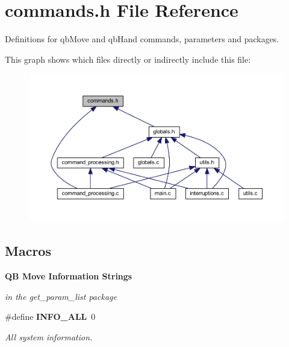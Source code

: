 \section{commands.\+h File Reference}
\label{commands_8h}


Definitions for qb\+Move and qb\+Hand commands, parameters and packages.  


This graph shows which files directly or indirectly include this file\+:
\nopagebreak
\begin{figure}[H]
\begin{center}
\leavevmode
\includegraphics[width=350pt]{commands_8h__dep__incl}
\end{center}
\end{figure}
\subsection*{Macros}
\begin{Indent}\textbf{ QB Move Information Strings}\par
{\em in the get\+\_\+param\+\_\+list package }\begin{DoxyCompactItemize}
\item 
\mbox{\label{commands_8h_a2ba44fc5b8a316bd307d0baa9ab629ef}} 
\#define \textbf{ I\+N\+F\+O\+\_\+\+A\+LL}~0
\begin{DoxyCompactList}\small\item\em All system information. \end{DoxyCompactList}\end{DoxyCompactItemize}
\end{Indent}
